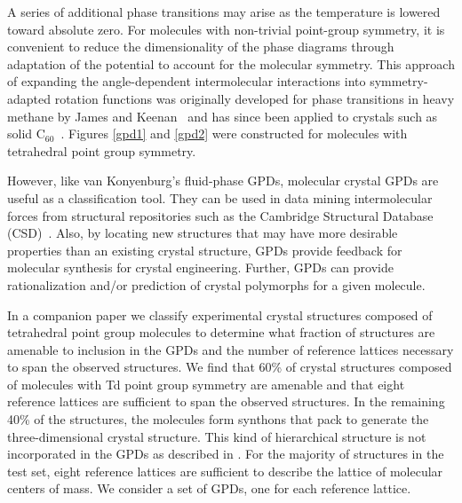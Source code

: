 \documentclass[preprint]{iucr}              %
\begin{document}
A series of additional phase transitions may arise as the
temperature is lowered toward absolute zero. For molecules with non-trivial
point-group symmetry, it is convenient to reduce the dimensionality of the phase
diagrams through adaptation of the potential to account for the molecular
symmetry. This approach of expanding the angle-dependent intermolecular
interactions into symmetry-adapted rotation functions was originally developed
for phase transitions in heavy methane by James and Keenan~\cite{James59} and
has since been applied to crystals such as solid
C$_{60}$~\cite{Michel92,Lamoen99}.  Figures \ref{gpd1} and \ref{gpd2} were
constructed for molecules with tetrahedral point group symmetry.

However, like van Konyenburg's fluid-phase GPDs, molecular crystal
GPDs are useful as a classification tool.  They can be used in data mining intermolecular forces from
structural repositories such as the Cambridge Structural Database
(CSD)~\cite{Allen02}.  Also, by locating new structures that may have more
desirable properties than an existing
crystal structure, GPDs provide feedback for molecular synthesis for crystal engineering. Further, GPDs
can provide rationalization and/or prediction of crystal polymorphs for a given
molecule.

In a companion paper\cite{McClurg09} we classify
experimental crystal structures composed of tetrahedral point group molecules to
determine what fraction of structures are amenable to inclusion in the GPDs and
the number of reference lattices necessary to span the observed structures.  We
find that 60\% of crystal structures composed of molecules with Td point group
symmetry are amenable and that eight reference lattices are sufficient to span
the observed structures.  In the remaining 40\% of the structures, the molecules
form synthons that pack to generate the three-dimensional crystal structure. 
This kind of hierarchical structure is not incorporated in the GPDs as described
in \cite{Mettes04}.  For the majority of structures in the test set, eight
reference lattices are sufficient to describe the lattice of molecular centers
of mass.  We consider a set of GPDs, one for each reference lattice.  
\end{document}
